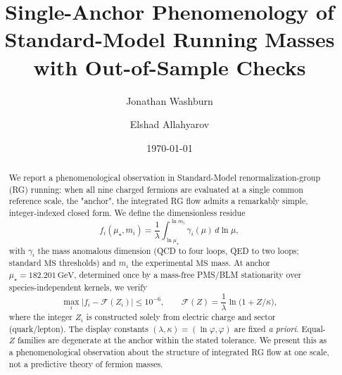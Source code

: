 \documentclass[aps,prd,onecolumn,amsmath,amssymb,superscriptaddress,nofootinbib,showpacs,showkeys]{revtex4-2}
\begin{document}

\title{\bfseries Single-Anchor Phenomenology of Standard-Model Running Masses with Out-of-Sample Checks}

\author{Jonathan Washburn}

\author{Elshad Allahyarov}

\date{\today}

\begin{abstract}
  We report a phenomenological observation in Standard-Model renormalization-group (RG) running:
  when all nine charged fermions are evaluated at a single common reference scale, the "anchor",
  the integrated RG flow admits a remarkably simple, integer-indexed closed form.
  We define the dimensionless residue
\[
f_i(\mu_\star,m_i)=\frac{1}{\lambda}\int_{\ln\mu_\star}^{\ln m_i}\!\gamma_i(\mu)\,d\ln\mu,
\]
with $\gamma_i$ the mass anomalous dimension (QCD to four loops, QED to two loops; standard $\overline{\mathrm{MS}}$
thresholds) and $m_i$ the experimental $\overline{\mathrm{MS}}$ mass.
At anchor $\mu_\star=182.201\,\mathrm{GeV}$, determined once by a mass-free PMS/BLM stationarity
over species-independent kernels, we verify
\[
\max_i\bigl|f_i-\mathcal F(Z_i)\bigr|\le10^{-6},\qquad \mathcal F(Z)=\frac{1}{\lambda}\ln\bigl(1+Z/\kappa\bigr),
\]
where the integer $Z_i$ is constructed solely from electric charge and sector (quark/lepton).
The display constants $(\lambda,\kappa)=(\ln\varphi,\varphi)$ are fixed \emph{a priori}. %
Equal-$Z$ families %
are degenerate at the anchor within the stated tolerance.
We present this as a phenomenological observation about the structure of integrated RG flow at one scale,
not a predictive theory of fermion masses.
\end{abstract}
\end{document}
